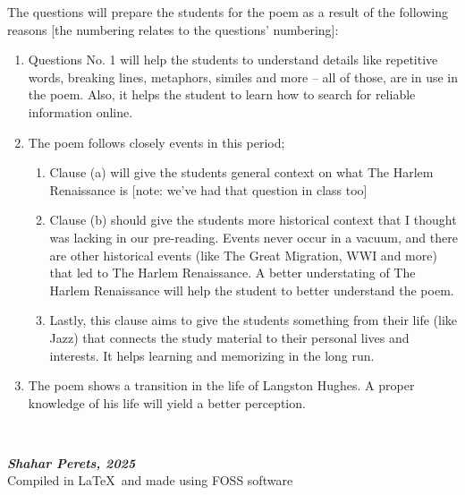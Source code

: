 \documentclass[]{article}
\newcommand\ndoc  {\normalsize \dotfill \\ \vfil {\begin{center}
            {\textbf{\textit{Shahar Perets, 2025}} \\
                \scriptsize Compiled in {\LaTeX}\ and made using FOSS software}
    \end{center}} \vfil	}
\begin{document}
    The questions will prepare the students for the poem as a result of the following reasons [the numbering relates to the questions' numbering]: 
    \begin{enumerate}
        \item Questions No. 1 will help the students to understand details like repetitive words, breaking lines, metaphors, similes and more -- all of those, are in use in the poem. Also, it helps the student to learn how to search for reliable information online. 
        \item The poem follows closely events in this period;
        \begin{enumerate}
            \item Clause (a) will give the students general context on what The Harlem Renaissance is [note: we've had that question in class too]
            \item Clause (b) should give the students more historical context that I thought was lacking in our pre-reading. Events never occur in a vacuum, and there are other historical events (like The Great Migration, WWI and more) that led to The Harlem Renaissance. A better understating of The Harlem Renaissance will help the student to better understand the poem. 
            \item Lastly, this clause aims to give the students something from their life (like Jazz) that connects the study material to their personal lives and interests. It helps learning and memorizing in the long run. 
        \end{enumerate}
        \item The poem shows a transition in the life of Langston Hughes. A proper knowledge of his life will yield a better perception. 
    \end{enumerate}
    
    \ndoc
    
    
\end{document}
